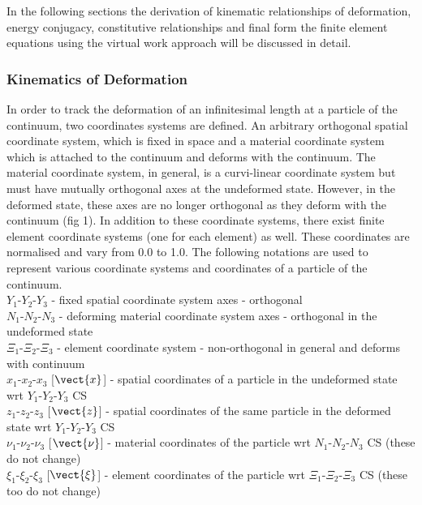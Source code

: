 In the following sections the derivation of kinematic relationships of deformation, energy conjugacy, constitutive relationships and final form 
the finite element equations using the virtual work approach will be discussed in detail.

\subsubsection{Kinematics of Deformation}
In order to track the deformation of an infinitesimal length at a particle of the continuum, two coordinates systems are defined. An arbitrary
orthogonal spatial coordinate system, which is fixed in space and a material coordinate system which is attached to the continuum and deforms 
with the continuum. The material coordinate system, in general, is a curvi-linear coordinate system but must have mutually orthogonal axes at the
undeformed state. However, in the deformed state, these axes are no longer orthogonal as they deform with the continuum (fig 1). In addition
to these coordinate systems, there exist finite element coordinate systems (one for each element) as well. These coordinates are normalised and 
vary from 0.0 to 1.0. The following notations are used to represent various coordinate systems and coordinates of a particle of the continuum.\\

\noindent $Y_{1}$-$Y_{2}$-$Y_{3}$ - fixed spatial coordinate system axes - orthogonal\\
$N_{1}$-$N_{2}$-$N_{3}$ - deforming material coordinate system axes  - orthogonal in the undeformed state\\
$\Xi_{1}$-$\Xi_{2}$-$\Xi_{3}$ - element coordinate system - non-orthogonal in general and deforms with continuum\\

\noindent $x_{1}$-$x_{2}$-$x_{3}$ [$\vect{x}$] - spatial coordinates of a particle in the undeformed state wrt $Y_{1}$-$Y_{2}$-$Y_{3}$ CS \\
$z_{1}$-$z_{2}$-$z_{3}$ [$\vect{z}$] - spatial coordinates of the same particle in the deformed state wrt $Y_{1}$-$Y_{2}$-$Y_{3}$ CS \\ 
$\nu_{1}$-$\nu_{2}$-$\nu_{3}$ [$\vect{\nu}$] - material coordinates of the particle wrt $N_{1}$-$N_{2}$-$N_{3}$ CS (these do not change) \\
$\xi_{1}$-$\xi_{2}$-$\xi_{3}$ [$\vect{\xi}$] - element coordinates of the particle wrt $\Xi_{1}$-$\Xi_{2}$-$\Xi_{3}$ CS (these too do not change)\\


